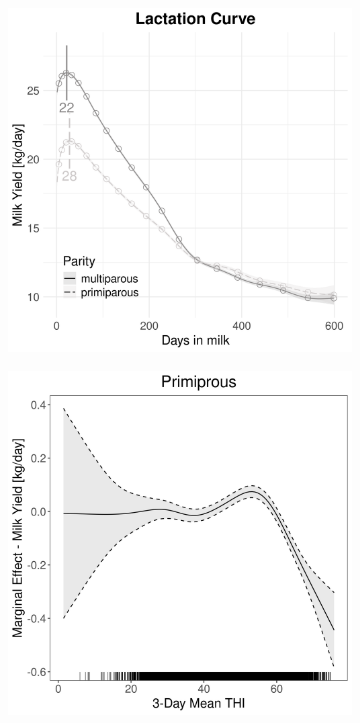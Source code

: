 \begin{figure}[H]
\begin{subfigure}[b]{0.45\textwidth}
        \includegraphics[width=\textwidth]{thesis/figures/models/milk/after2010/si_milk_after2010/si_milk_after2010_marginal_dim_milk_combined.png}
    \end{subfigure}
    \begin{subfigure}[b]{0.45\textwidth}
        \centering
        \includegraphics[width=\textwidth]{thesis/figures/models/milk/after2010/si_milk_after2010/si_milk_after2010_marginal_thi_milk_primi.png}

\end{subfigure}
\end{figure}
